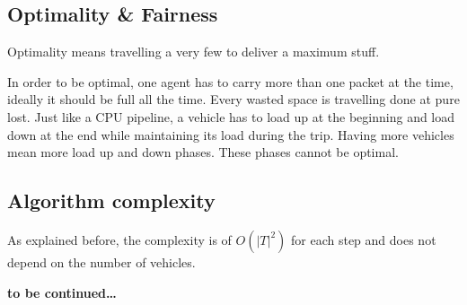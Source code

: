 \documentclass[11pt,a4paper]{article}
\begin{document}
\subsection*{Optimality \& Fairness}

Optimality means travelling a very few to deliver a maximum stuff.

In order to be optimal, one agent has to carry more than one packet at the time, ideally it should be full all the time. Every wasted space is travelling done at pure lost. Just like a CPU pipeline, a vehicle has to load up at the beginning and load down at the end while maintaining its load during the trip. Having more vehicles mean more load up and down phases. These phases cannot be optimal.

%
%

\subsection*{Algorithm complexity}

As explained before, the complexity is of $O(|T|^2)$ for each step and does not
depend on the number of vehicles.

\textbf{to be continued\ldots}
\end{document}
